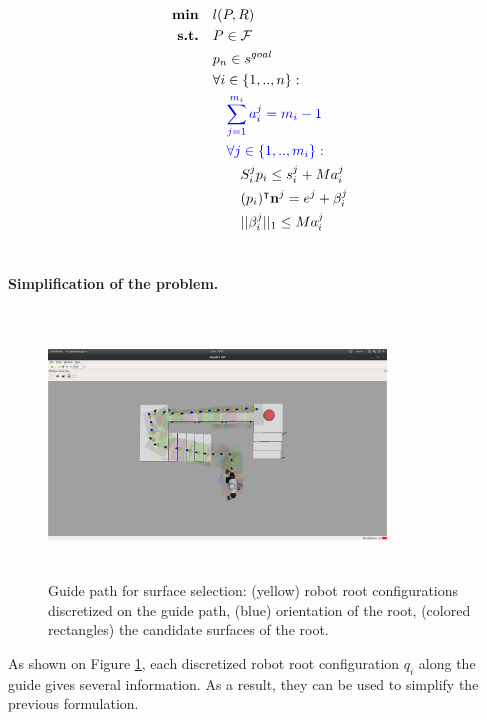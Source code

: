 \begin{align}
    \textrm{\textbf{min}}  \quad & l(P,R) \nonumber\\
    \textrm{\textbf{s.t.}}  \quad & P \in \mathcal{F} \nonumber\\
                            \quad & p_n \in s^{goal} \nonumber\\
                            \quad & \forall i \in \{1,..,n\} : \nonumber\\
                                \quad & \quad \textcolor{blue}{\sum_{j=1}^{m_i} a_i^j = m_i-1} \label{eq:mbc:mip_complete:card_pruned}\\
                                \quad & \quad \textcolor{blue}{\forall j \in \{1,..,m_i\} :} \nonumber\\
                                    \quad & \quad \quad S_i^j p_i \leq s_i^j + M a_i^j  \nonumber\\
                                    \quad & \quad \quad (p_i)^{\intercal} \textbf{n}^j = e^j + \beta_i^j \nonumber\\
                                    \quad & \quad \quad ||\beta_i^j||_1 \leq M a_i^j \nonumber\\
                                    \nonumber
\end{align}

\paragraph{Simplification of the problem.}
\begin{figure}[h!]
    \centering
    \captionsetup[subfigure]{justification=centering}
    \includegraphics[trim={15cm 5cm 18cm 7cm},clip,width=0.8\textwidth,height=7cm]{Figures/Chapter_MIP_SL1M/bauzil_guide_surfaces.png}
    \caption{Guide path for surface selection: (yellow) robot root configurations discretized on the guide path, (blue) orientation of the root, (colored rectangles) the candidate surfaces of the root.\label{fig:mip:bauzil_guide_surfaces}}
\end{figure}
As shown on Figure \ref{fig:mip:bauzil_guide_surfaces}, each discretized robot root configuration $q_i$ along the guide gives several information. As a result, they can be used to simplify the previous formulation.

